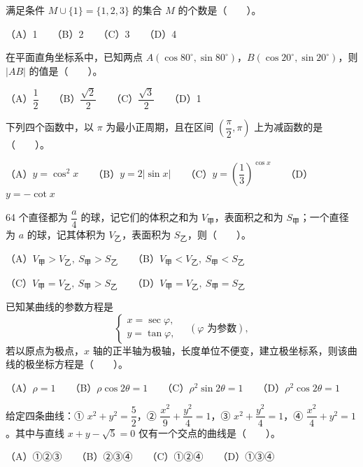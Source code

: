 \begin{question}
满足条件 \(M\cup\{1\}=\{1,2,3\}\) 的集合 \(M\) 的个数是\mbox{（　　）}。

（A）1　　（B）2　　（C）3　　（D）4

\end{question}
\begin{question}
在平面直角坐标系中，已知两点 \(A(\cos80^\circ,\sin80^\circ)\)，\(B(\cos20^\circ,\sin20^\circ)\)，则 \(|AB|\) 的值是\mbox{（　　）}。

（A）\(\dfrac12\)　　（B）\(\dfrac{\sqrt2}{2}\)　　（C）\(\dfrac{\sqrt3}{2}\)　　（D）1

\end{question}
\begin{question}
下列四个函数中，以 \(\pi\) 为最小正周期，且在区间 \(\left(\dfrac\pi2,\pi\right)\) 上为减函数的是\mbox{（　　）}。

（A）\(y=\cos^2x\)　　（B）\(y=2|\sin x|\)　　（C）\(y=\left(\dfrac13\right)^{\cos x}\)　　（D）\(y=-\cot x\)

\end{question}
\begin{question}
64 个直径都为 \(\dfrac a4\) 的球，记它们的体积之和为 \(V_{\text{甲}}\)，表面积之和为 \(S_{\text{甲}}\)；一个直径为 \(a\) 的球，记其体积为 \(V_{\text{乙}}\)，表面积为 \(S_{\text{乙}}\)，则\mbox{（　　）}。

（A）\(V_{\text{甲}}>V_{\text{乙}},\ S_{\text{甲}}>S_{\text{乙}}\)　　（B）\(V_{\text{甲}}<V_{\text{乙}},\ S_{\text{甲}}<S_{\text{乙}}\)

（C）\(V_{\text{甲}}=V_{\text{乙}},\ S_{\text{甲}}>S_{\text{乙}}\)　　（D）\(V_{\text{甲}}=V_{\text{乙}},\ S_{\text{甲}}=S_{\text{乙}}\)

\end{question}
\begin{question}
已知某曲线的参数方程是
\nopagebreak[4]
\[
\begin{cases}
x=\sec\varphi,\\
y=\tan\varphi,
\end{cases}
\quad(\varphi\text{ 为参数}),
\]
若以原点为极点，\(x\) 轴的正半轴为极轴，长度单位不便变，建立极坐标系，则该曲线的极坐标方程是\mbox{（　　）}。

（A）\(\rho=1\)　　（B）\(\rho\cos2\theta=1\)　　（C）\(\rho^2\sin2\theta=1\)　　（D）\(\rho^2\cos2\theta=1\)

\end{question}
\begin{question}
给定四条曲线：① \(x^2+y^2=\dfrac52\)，② \(\dfrac{x^2}{9}+\dfrac{y^2}{4}=1\)，③ \(x^2+\dfrac{y^2}{4}=1\)，④ \(\dfrac{x^2}{4}+y^2=1\)。其中与直线 \(x+y-\sqrt5=0\) 仅有一个交点的曲线是\mbox{（　　）}。

（A）①②③　　（B）②③④　　（C）①②④　　（D）①③④

\end{question}
